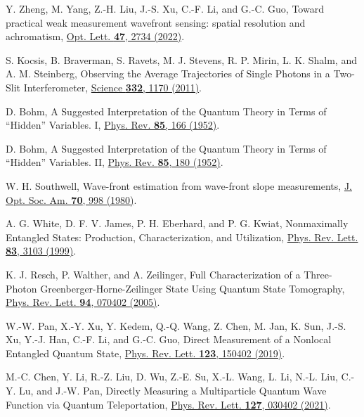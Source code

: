\documentclass[pra,english,reprint,nofootinbib,aps,superscriptaddress,showpacs,showkeys]{revtex4-2}
\theoremstyle{definition}
\theoremstyle{remark}
\begin{document}
\begin{thebibliography}{99}
		Y. Zheng, M. Yang, Z.-H. Liu, J.-S. Xu, C.-F. Li, and G.-C. Guo,
		Toward practical weak measurement wavefront sensing: spatial resolution and achromatism,
		\href{https://doi.org/10.1364/OL.460873}{Opt. Lett. \textbf{47}, 2734 (2022)}.
		
		S. Kocsis, B. Braverman, S. Ravets, M. J. Stevens, R. P. Mirin, L. K. Shalm, and A. M. Steinberg,
		Observing the Average Trajectories of Single Photons in a Two-Slit Interferometer,
		\href{https://doi.org/10.1126/science.1202218}{Science \textbf{332}, 1170 (2011)}.
		
		D. Bohm,
		A Suggested Interpretation of the Quantum Theory in Terms of ``Hidden'' Variables. I,
		\href{https://doi.org/10.1103/PhysRev.85.166}{Phys. Rev. \textbf{85}, 166 (1952)}.
		
		D. Bohm,
		A Suggested Interpretation of the Quantum Theory in Terms of ``Hidden'' Variables. II,
		\href{https://doi.org/10.1103/PhysRev.85.180}{Phys. Rev. \textbf{85}, 180 (1952)}.
		
		W. H. Southwell,
		Wave-front estimation from wave-front slope measurements,
		\href{https://doi.org/10.1364/JOSA.70.000998}{J. Opt. Soc. Am. \textbf{70}, 998 (1980)}.
		
		A. G. White, D. F. V. James, P. H. Eberhard, and P. G. Kwiat,
		Nonmaximally Entangled States: Production, Characterization, and Utilization,
		\href{https://doi.org/10.1103/PhysRevLett.83.3103}{Phys. Rev. Lett. \textbf{83}, 3103 (1999)}.
		
		K. J. Resch, P. Walther, and A. Zeilinger,
		Full Characterization of a Three-Photon Greenberger-Horne-Zeilinger State Using Quantum State Tomography,
		\href{https://doi.org/10.1103/PhysRevLett.94.070402}{Phys. Rev. Lett. \textbf{94}, 070402 (2005)}.
		
		W.-W. Pan, X.-Y. Xu, Y. Kedem, Q.-Q. Wang, Z. Chen, M. Jan, K. Sun, J.-S. Xu, Y.-J. Han, C.-F. Li, and G.-C. Guo,
		Direct Measurement of a Nonlocal Entangled Quantum State,
		\href{https://doi.org/10.1103/PhysRevLett.123.150402}{Phys. Rev. Lett. \textbf{123}, 150402 (2019)}.
		
		M.-C. Chen, Y. Li, R.-Z. Liu, D. Wu, Z.-E. Su, X.-L. Wang, L. Li, N.-L. Liu, C.-Y. Lu, and J.-W. Pan,
		Directly Measuring a Multiparticle Quantum Wave Function via Quantum Teleportation,
		\href{https://doi.org/10.1103/PhysRevLett.127.030402}{Phys. Rev. Lett. \textbf{127}, 030402 (2021)}.
		

\end{thebibliography}
\end{document}
